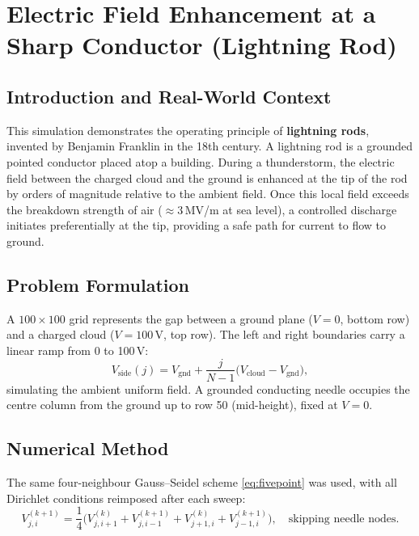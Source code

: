 \documentclass[11pt,a4paper]{article}
\begin{document}
\section{Electric Field Enhancement at a Sharp Conductor (Lightning Rod)}

\subsection{Introduction and Real-World Context}

This simulation demonstrates the operating principle of \textbf{lightning rods}, invented by Benjamin Franklin in the 18th century. A lightning rod is a grounded pointed conductor placed atop a building. During a thunderstorm, the electric field between the charged cloud and the ground is enhanced at the tip of the rod by orders of magnitude relative to the ambient field. Once this local field exceeds the breakdown strength of air (${\approx}3$\,MV/m at sea level), a controlled discharge initiates preferentially at the tip, providing a safe path for current to flow to ground.

\subsection{Problem Formulation}

A $100 \times 100$ grid represents the gap between a ground plane ($V=0$, bottom row) and a charged cloud ($V=100$\,V, top row). The left and right boundaries carry a linear ramp from 0 to 100\,V:
\begin{equation}
V_{\text{side}}(j) = V_{\text{gnd}} + \frac{j}{N-1}\bigl(V_{\text{cloud}} - V_{\text{gnd}}\bigr),
\end{equation}
simulating the ambient uniform field. A grounded conducting needle occupies the centre column from the ground up to row 50 (mid-height), fixed at $V=0$.

\subsection{Numerical Method}

The same four-neighbour Gauss--Seidel scheme \eqref{eq:fivepoint} was used, with all Dirichlet conditions reimposed after each sweep:
\begin{equation}
V_{j,i}^{(k+1)} = \frac{1}{4}\bigl(V_{j,i+1}^{(k)} + V_{j,i-1}^{(k+1)} + V_{j+1,i}^{(k)} + V_{j-1,i}^{(k+1)}\bigr), \quad \text{skipping needle nodes}.
\end{equation}
\end{document}
